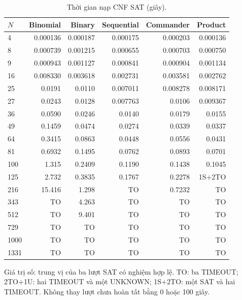 \begin{table}[pos=H]
\centering
\small
\caption{Thời gian nạp CNF SAT (giây).}
\label{tab:sat_load}
\setlength{\tabcolsep}{4pt}
\begin{tabular}{@{}lrrrrr@{}}
\toprule
$N$ & Binomial & Binary & Sequential & Commander & Product \\
\midrule
4 & 0.000136 & 0.000187 & 0.000175 & 0.000203 & 0.000136 \\
8 & 0.000739 & 0.001215 & 0.000655 & 0.000703 & 0.000750 \\
9 & 0.000943 & 0.001127 & 0.000841 & 0.000904 & 0.001134 \\
16 & 0.008330 & 0.003618 & 0.002731 & 0.003581 & 0.002762 \\
25 & 0.0191 & 0.0110 & 0.007011 & 0.008278 & 0.008171 \\
27 & 0.0243 & 0.0128 & 0.007763 & 0.0106 & 0.009367 \\
36 & 0.0590 & 0.0246 & 0.0140 & 0.0179 & 0.0155 \\
49 & 0.1459 & 0.0474 & 0.0274 & 0.0339 & 0.0337 \\
64 & 0.3415 & 0.0863 & 0.0448 & 0.0556 & 0.0431 \\
81 & 0.6932 & 0.1495 & 0.0762 & 0.0893 & 0.0701 \\
100 & 1.315 & 0.2409 & 0.1190 & 0.1438 & 0.1045 \\
125 & 2.732 & 0.3835 & 0.1767 & 0.2278 & 1S+2TO \\
216 & 15.416 & 1.298 & TO & 0.7232 & TO \\
343 & TO & 4.263 & TO & TO & TO \\
512 & TO & 9.401 & TO & TO & TO \\
729 & TO & TO & TO & TO & TO \\
1000 & TO & TO & TO & TO & TO \\
1331 & TO & TO & TO & TO & TO \\
\bottomrule
\end{tabular}
\par\smallskip\begin{minipage}{\linewidth}\footnotesize Giá trị số: trung vị của ba lượt SAT có nghiệm hợp lệ. TO: ba TIMEOUT; 2TO+1U: hai TIMEOUT và một UNKNOWN; 1S+2TO: một SAT và hai TIMEOUT. Không thay lượt chưa hoàn tất bằng 0 hoặc 100 giây.\end{minipage}
\end{table}
